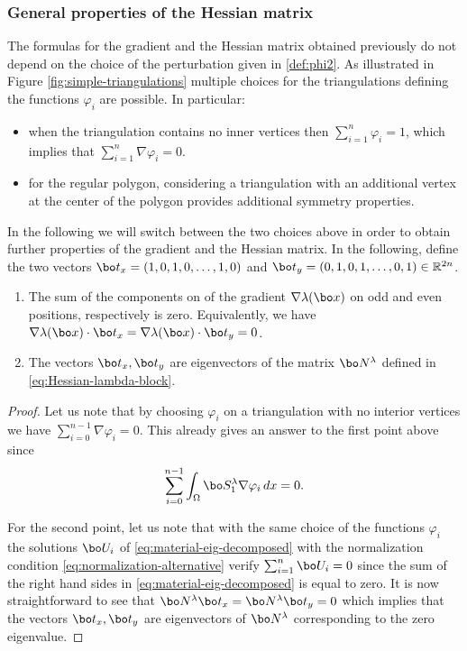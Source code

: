 \subsubsection*{General properties of the Hessian matrix} The formulas for the gradient and the Hessian matrix obtained previously do not depend on the choice of the perturbation given in \eqref{def:phi2}. As illustrated in Figure \ref{fig:simple-triangulations} multiple choices for the triangulations defining the functions $\varphi_i$ are possible. In particular:
\begin{itemize}
\item when the triangulation contains no inner vertices then $\sum_{i=1}^n \varphi_i=1$, which implies that $\sum_{i=1}^n \nabla \varphi_i = 0$.
\item for the regular polygon, considering a triangulation with an additional vertex at the center of the polygon provides additional symmetry properties.
\end{itemize}
In the following we will switch between the two choices above in order to obtain further properties of the gradient and the Hessian matrix. In the following, define the two vectors $\bo t_x = (1,0,1,0,\dots,1,0)$ and $\bo t_y = (0,1,0,1,\dots,0,1) \in \Bbb{R}^{2n}$.

\skpt
\begin{propo}\label{prop:translation-eigenvectors}
\begin{enumerate}
\item
The sum of the components on of the gradient $\nabla \lambda(\bo x)$ on odd and even positions, respectively is zero. Equivalently, we have $\nabla \lambda(\bo x) \cdot \bo t_x = \nabla \lambda(\bo x) \cdot \bo t_y = 0$.

\item
The vectors $\bo t_x, \bo t_y$ are eigenvectors of the matrix $\bo N^\lambda$ defined in \eqref{eq:Hessian-lambda-block}.
\end{enumerate}
\end{propo}

\begin{proof} Let us note that by choosing $\varphi_i$ on a triangulation with no interior vertices we have $\sum_{i=0}^{n-1} \nabla \varphi_i = 0$. This already gives an answer to the first point above since
\[
\sum_{i=0}^{n-1} \int_\Omega \bo S_1^\lambda \nabla \varphi_i\, dx = 0.
\]

For the second point, let us note that with the same choice of the functions $\varphi_i$ the solutions $\bo U_i$ of \eqref{eq:material-eig-decomposed} with the normalization condition \eqref{eq:normalization-alternative} verify $\sum_{i=1}^n \bo U_i = 0$ since the sum of the right hand sides in \eqref{eq:material-eig-decomposed} is equal to zero. It is now straightforward to see that $\bo N^\lambda \bo t_x = \bo N^\lambda \bo t_y = 0$ which implies that the vectors $\bo t_x,\bo t_y$ are eigenvectors of $\bo N^\lambda$ corresponding to the zero eigenvalue.
\end{proof}

